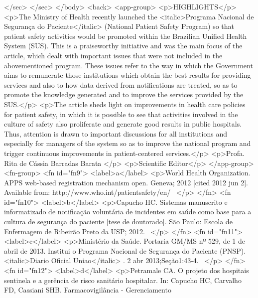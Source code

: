         </sec>
      </sec>
    </body>
    <back>
      <app-group>
        <p>HIGHLIGHTS</p>
        <p>The Ministry of Health recently launched the <italic>Programa Nacional de Segurança do
            Paciente</italic> (National Patient Safety Program) so that patient safety activities
          would be promoted within the Brazilian Unified Health System (SUS). This is a praiseworthy
          initiative and was the main focus of the article, which dealt with important issues that
          were not included in the abovementioned program. These issues refer to the way in which
          the Government aims to remunerate those institutions which obtain the best results for
          providing services and also to how data derived from notifications are treated, so as to
          promote the knowledge generated and to improve the services provided by the SUS.</p>
        <p>The article sheds light on improvements in health care policies for patient safety, in
          which it is possible to see that activities involved in the culture of safety also
          proliferate and generate good results in public hospitals. Thus, attention is drawn to
          important discussions for all institutions and especially for managers of the system so as
          to improve the national program and trigger continuous improvements in patient-centered
          services.</p>
        <p>Profa. Rita de Cássia Barradas Barata </p>
        <p>Scientific Editor</p>
      </app-group>
      <fn-group>
        <fn id="fn9">
          <label>a</label>
          <p>World Health Organization. APPS web-based registration mechanism open. Geneva; 2012
            [cited 2012 jun 2]. Available from: http://www.who.int/patientsafety/en/  </p>
        </fn>
        <fn id="fn10">
          <label>b</label>
          <p>Capucho HC. Sistemas manuscrito e informatizado de notificação voluntária de incidentes
            em saúde como base para a cultura de segurança do paciente [tese de doutorado]. São
            Paulo: Escola de Enfermagem de Ribeirão Preto da USP; 2012.  </p>
        </fn>
        <fn id="fn11">
          <label>c</label>
          <p>Ministério da Saúde. Portaria GM/MS nº 529, de 1 de abril de 2013. Institui o Programa
            Nacional de Segurança do Paciente (PNSP). <italic>Diario Oficial Uniao</italic> . 2 abr
            2013;Seção1:43-4.  </p>
        </fn>
        <fn id="fn12">
          <label>d</label>
          <p>Petramale CA. O projeto dos hospitais sentinela e a gerência de risco sanitário
            hospitalar. In: Capucho HC, Carvalho FD, Cassiani SHB. Farmacovigilância - Gerenciamento
